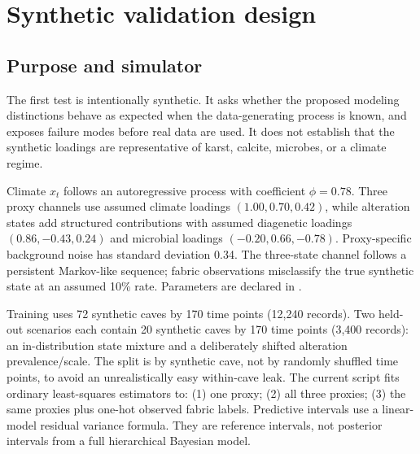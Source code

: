 \documentclass[11pt,a4paper]{article}
\begin{document}
\section{Synthetic validation design}
\subsection{Purpose and simulator}
The first test is intentionally synthetic. It asks whether the proposed modeling distinctions behave as expected when the data-generating process is known, and exposes failure modes before real data are used. It does not establish that the synthetic loadings are representative of karst, calcite, microbes, or a climate regime.

Climate $x_t$ follows an autoregressive process with coefficient $\phi=0.78$. Three proxy channels use assumed climate loadings $(1.00,0.70,0.42)$, while alteration states add structured contributions with assumed diagenetic loadings $(0.86,-0.43,0.24)$ and microbial loadings $(-0.20,0.66,-0.78)$. Proxy-specific background noise has standard deviation 0.34. The three-state channel follows a persistent Markov-like sequence; fabric observations misclassify the true synthetic state at an assumed 10\% rate. Parameters are declared in \texttt{}.

Training uses 72 synthetic caves by 170 time points (12,240 records). Two held-out scenarios each contain 20 synthetic caves by 170 time points (3,400 records): an in-distribution state mixture and a deliberately shifted alteration prevalence/scale. The split is by synthetic cave, not by randomly shuffled time points, to avoid an unrealistically easy within-cave leak. The current script fits ordinary least-squares estimators to: (1) one proxy; (2) all three proxies; (3) the same proxies plus one-hot observed fabric labels. Predictive intervals use a linear-model residual variance formula. They are reference intervals, not posterior intervals from a full hierarchical Bayesian model.
\end{document}

